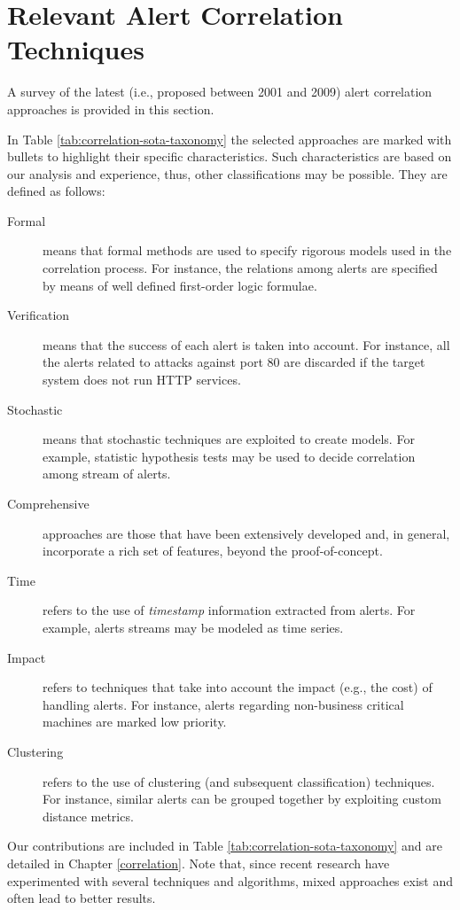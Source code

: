 \section{Relevant Alert Correlation Techniques}
\label{detection:correlation} A survey of the latest (i.e., proposed
between 2001 and 2009) alert correlation approaches is provided in
this section.

In Table \ref{tab:correlation-sota-taxonomy} the selected approaches
are marked with bullets to highlight their specific
characteristics. Such characteristics are based on our analysis and
experience, thus, other classifications may be possible. They are
defined as follows:

\begin{description}
\item[Formal] means that formal methods are used to specify rigorous
models used in the correlation process. For instance, the relations
among alerts are specified by means of well defined first-order logic
formulae.
\item[Verification] means that the success of each alert is taken into
account. For instance, all the alerts related to attacks against port
80 are discarded if the target system does not run
\ac{HTTP} services.
\item[Stochastic] means that stochastic techniques are exploited to
create models. For example, statistic hypothesis tests may be used to
decide correlation among stream of alerts.
\item[Comprehensive] approaches are those that have been extensively
developed and, in general, incorporate a rich set of features, beyond
the proof-of-concept.
\item[Time] refers to the use of \emph{timestamp} information
extracted from alerts. For example, alerts streams may be modeled as
time series.
\item[Impact] refers to techniques that take into account the impact
(e.g., the cost) of handling alerts. For instance, alerts regarding
non-business critical machines are marked low priority.
\item[Clustering] refers to the use of clustering (and subsequent
classification) techniques. For instance, similar alerts can be
grouped together by exploiting custom distance metrics.
\end{description}

Our contributions are included in Table
\ref{tab:correlation-sota-taxonomy} and are detailed in Chapter
\ref{correlation}. Note that, since recent research have experimented
with several techniques and algorithms, mixed approaches exist and
often lead to better results.

